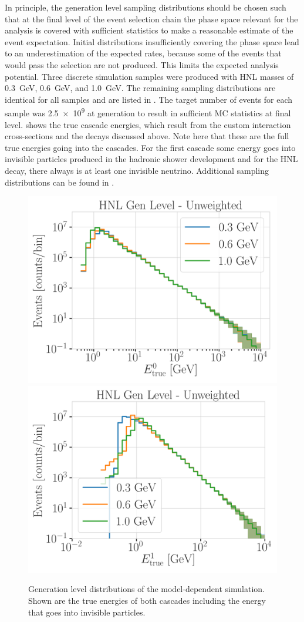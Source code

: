 In principle, the generation level sampling distributions should be chosen such that at the final level of the event selection chain the phase space relevant for the analysis is covered with sufficient statistics to make a reasonable estimate of the event expectation. Initial distributions insufficiently covering the phase space lead to an underestimation of the expected rates, because some of the events that would pass the selection are not produced. This limits the expected analysis potential. Three discrete simulation samples were produced with HNL masses of \SI{0.3}{\GeV}, \SI{0.6}{\GeV}, and \SI{1.0}{\GeV}. The remaining sampling distributions are identical for all samples and are listed in . The target number of events for each sample was \SI{2.5e9}{} at generation to result in sufficient MC statistics at final level.  shows the true cascade energies, which result from the custom interaction cross-sections and the decays discussed above. Note here that these are the full true energies going into the cascades. For the first cascade some energy goes into invisible particles produced in the hadronic shower development and for the HNL decay, there always is at least one invisible neutrino. Additional sampling distributions can be found in .
\begin{figure}[h]
    \includegraphics[width=0.49\linewidth]{figures/hnl_simulation/generation/1_d_distr_casc0_true_energy_gen_level_unweighted.png}
    \includegraphics[width=0.49\linewidth]{figures/hnl_simulation/generation/1_d_distr_casc1_true_energy_gen_level_unweighted.png}
    \caption[Model-dependent simulation generation level distributions]{Generation level distributions of the model-dependent simulation. Shown are the true energies of both cascades including the energy that goes into invisible particles.}
\end{figure}


